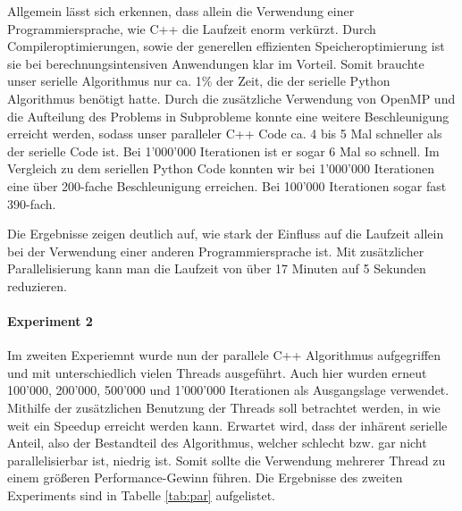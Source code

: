 \documentclass[sigconf]{acmart}
\begin{document}
Allgemein lässt sich erkennen, dass allein die Verwendung einer Programmiersprache, wie C++ die Laufzeit enorm verkürzt. Durch Compileroptimierungen, sowie der generellen effizienten Speicheroptimierung ist sie bei berechnungsintensiven Anwendungen klar im Vorteil. Somit brauchte unser serielle Algorithmus nur ca. 1\% der Zeit, die der serielle Python Algorithmus benötigt hatte. 
Durch die zusätzliche Verwendung von OpenMP und die Aufteilung des Problems in Subprobleme konnte eine weitere Beschleunigung erreicht werden, sodass unser paralleler C++ Code ca. 4 bis 5 Mal schneller als der serielle Code ist. Bei 1'000'000 Iterationen ist er sogar 6 Mal so schnell. Im Vergleich zu dem seriellen Python Code konnten wir bei 1'000'000 Iterationen eine über 200-fache Beschleunigung erreichen. Bei 100'000 Iterationen sogar fast 390-fach.

Die Ergebnisse zeigen deutlich auf, wie stark der Einfluss auf die Laufzeit allein bei der Verwendung einer anderen Programmiersprache ist. Mit zusätzlicher Parallelisierung kann man die Laufzeit von über 17 Minuten auf 5 Sekunden reduzieren.

\paragraph{Experiment 2}

Im zweiten Experiemnt wurde nun der parallele C++ Algorithmus aufgegriffen und mit unterschiedlich vielen Threads ausgeführt. Auch hier wurden erneut 100'000, 200'000, 500'000 und 1'000'000 Iterationen als Ausgangslage verwendet. Mithilfe der zusätzlichen Benutzung der Threads soll betrachtet werden, in wie weit ein Speedup erreicht werden kann. Erwartet wird, dass der inhärent serielle Anteil, also der Bestandteil des Algorithmus, welcher schlecht bzw. gar nicht parallelisierbar ist, niedrig ist. Somit sollte die Verwendung mehrerer Thread zu einem größeren Performance-Gewinn führen. 
Die Ergebnisse des zweiten Experiments sind in Tabelle \ref{tab:par} aufgelistet. 


\begin{table}[htbp]
  \caption{Vergleich der des parallelen C++ Algorithmus mit unterschiedlich vielen Threads über 100'000, 200'000, 500'000 und 1'000'000 Iterationen. Alle Angaben in Sekunden.}
  \label{tab:par}
\end{table}
\end{document}
